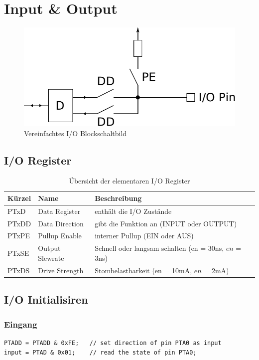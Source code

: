\newpage
\section{Input \& Output}

\begin{figure}[h!]
	\centering
	\includegraphics[scale=1]{../fig/io.pdf}
	\caption{Vereinfachtes I/O Blockschaltbild}
\end{figure}

\subsection{I/O Register}

\begin{table}[h!]
	\centering
	\begin{tabular}{l l l}
	Kürzel & Name & Beschreibung \\
	\hline
	PTxD
		& Data Register	
		& enthält die I/O Zustände \\
	PTxDD
		& Data Direction
		& gibt die Funktion an (INPUT oder OUTPUT) \\
	PTxPE
		& Pullup Enable
		& interner Pullup (EIN oder AUS) \\
	PTxSE
		& Output Slewrate
		& Schnell oder langsam schalten (en = 30ns, $\overline{en}$ = 3ns) \\
	PTxDS
		& Drive Strength
		& Stombelastbarkeit (en = 10mA, $\overline{en}$ = 2mA)
	\end{tabular}
	\caption{Übersicht der elementaren I/O Register 
		\protect \cite[S.163]{hcs08}}
\end{table}

\subsection{I/O Initialisiren}

\subsubsection{Eingang}
\begin{lstlisting}
PTADD = PTADD & 0xFE;	// set direction of pin PTA0 as input
input = PTAD & 0x01;	// read the state of pin PTA0;
\end{lstlisting}

